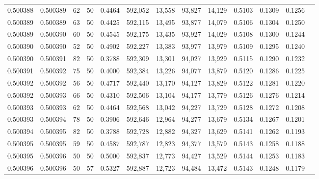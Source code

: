 \begin{tabular}{rrrrrrrrrrrrr}
0.500388 & 0.500389 &    62 &  50 &                                     0.4464 & 592,052 &  13,558 &  93,827 &  14,129 & 0.5103 & 0.1309 & 0.1256 \\
0.500389 & 0.500389 &    63 &  50 &                                     0.4425 & 592,115 &  13,495 &  93,877 &  14,079 & 0.5106 & 0.1304 & 0.1250 \\
0.500389 & 0.500390 &    60 &  50 &                                     0.4545 & 592,175 &  13,435 &  93,927 &  14,029 & 0.5108 & 0.1300 & 0.1244 \\
0.500390 & 0.500390 &    52 &  50 &                                     0.4902 & 592,227 &  13,383 &  93,977 &  13,979 & 0.5109 & 0.1295 & 0.1240 \\
0.500390 & 0.500391 &    82 &  50 &                                     0.3788 & 592,309 &  13,301 &  94,027 &  13,929 & 0.5115 & 0.1290 & 0.1232 \\
0.500391 & 0.500392 &    75 &  50 &                                     0.4000 & 592,384 &  13,226 &  94,077 &  13,879 & 0.5120 & 0.1286 & 0.1225 \\
0.500392 & 0.500392 &    56 &  50 &                                     0.4717 & 592,440 &  13,170 &  94,127 &  13,829 & 0.5122 & 0.1281 & 0.1220 \\
0.500392 & 0.500393 &    66 &  50 &                                     0.4310 & 592,506 &  13,104 &  94,177 &  13,779 & 0.5126 & 0.1276 & 0.1214 \\
0.500393 & 0.500393 &    62 &  50 &                                     0.4464 & 592,568 &  13,042 &  94,227 &  13,729 & 0.5128 & 0.1272 & 0.1208 \\
0.500393 & 0.500394 &    78 &  50 &                                     0.3906 & 592,646 &  12,964 &  94,277 &  13,679 & 0.5134 & 0.1267 & 0.1201 \\
0.500394 & 0.500395 &    82 &  50 &                                     0.3788 & 592,728 &  12,882 &  94,327 &  13,629 & 0.5141 & 0.1262 & 0.1193 \\
0.500395 & 0.500395 &    59 &  50 &                                     0.4587 & 592,787 &  12,823 &  94,377 &  13,579 & 0.5143 & 0.1258 & 0.1188 \\
0.500395 & 0.500396 &    50 &  50 &                                     0.5000 & 592,837 &  12,773 &  94,427 &  13,529 & 0.5144 & 0.1253 & 0.1183 \\
0.500396 & 0.500396 &    50 &  57 &                                     0.5327 & 592,887 &  12,723 &  94,484 &  13,472 & 0.5143 & 0.1248 & 0.1179 \\

\end{tabular}
